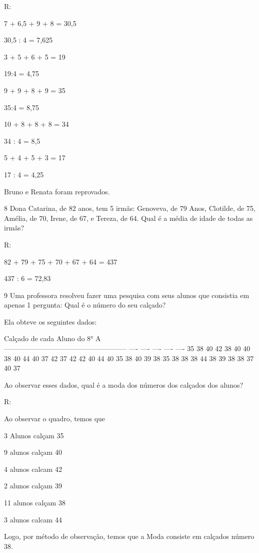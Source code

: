 {R:
\item

7 + 6,5 + 9 + 8 = 30,5

30,5 : 4 = 7,625
\item

3 + 5 + 6 + 5 = 19

19:4 = 4,75
\item 9 + 9 + 8 + 9 = 35

35:4 = 8,75
\item

10 + 8 + 8 + 8 = 34

34 : 4 = 8,5
\item

5 + 4 + 5 + 3 = 17

17 : 4 = 4,25
\item Bruno e Renata foram reprovados.

\num{8} Dona Catarina, de 82 anos, tem 5 irmãs: Genoveva, de 79 Anos,
Clotilde, de 75, Amélia, de 70, Irene, de 67, e Tereza, de 64. Qual é a
média de idade de todas as irmãs?

R:

82 + 79 + 75 + 70 + 67 + 64 = 437

437 : 6 = 72,83

\num{9} Uma professora resolveu fazer uma pesquisa com seus alunos que
consistia em apenas 1 pergunta: Qual é o número do seu calçado?

Ela obteve os seguintes dados:

Calçado de cada Aluno do 8° A\\
----------------------------------------------------- ---- ---- ----
---- ---- 35 38 40 42 38 40 40 38 40 44 40 37 42 37 42 42 40 44 40 35 38
40 39 38 35 38 38 38 44 38 39 38 38 37 40 37

Ao observar esses dados, qual é a moda dos números dos calçados dos
alunos?

R:

Ao observar o quadro, temos que

3 Alunos calçam 35

9 alunos calçam 40

4 alunos calcam 42

2 alunos calçam 39

11 alunos calçam 38

3 alunos calcam 44

Logo, por método de observação, temos que a Moda consiste em calçados
número 38.

}
